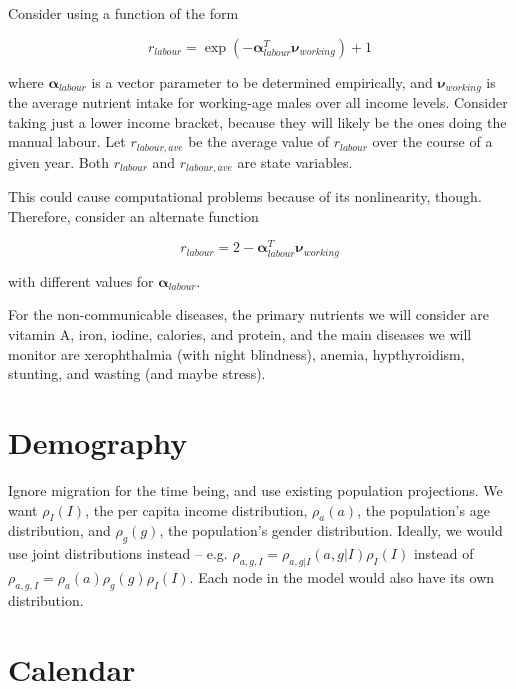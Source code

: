 \documentclass[letter,12pt]{article}
\begin{document}
Consider using a function of the form

\begin{equation}
r_{labour} = \exp \left(- \boldsymbol \alpha_{labour}^T \boldsymbol \nu_{working} \right) + 1
\end{equation}

\noindent where $\boldsymbol \alpha_{labour}$ is a vector parameter to be determined empirically, and $\boldsymbol \nu_{working}$ is the average nutrient intake for working-age males over all income levels.  Consider taking just a lower income bracket, because they will likely be the ones doing the manual labour.  Let $r_{labour,ave}$ be the average value of $r_{labour}$ over the course of a given year.  Both $r_{labour}$ and $r_{labour,ave}$ are state variables.

This could cause computational problems because of its nonlinearity, though.  Therefore, consider an alternate function

\begin{equation}
r_{labour} = 2 - \boldsymbol \alpha_{labour}^T \boldsymbol \nu_{working}
\end{equation}

\noindent with different values for $\boldsymbol \alpha_{labour}$.

For the non-communicable diseases, the primary nutrients we will consider are vitamin A, iron, iodine, calories, and protein, and the main diseases we will monitor are xerophthalmia (with night blindness), anemia, hypthyroidism, stunting, and wasting (and maybe stress).

\section{Demography}

Ignore migration for the time being, and use existing population projections.  We want $\rho_I \left(I\right)$, the per capita income distribution, $\rho_{a} \left(a\right)$, the population's age distribution, and $\rho_g \left(g\right)$, the population's gender distribution.  Ideally, we would use joint distributions instead -- e.g. $\rho_{a,g,I} = \rho_{a,g|I} \left(a,g|I\right) \rho_I \left(I\right)$ instead of $\rho_{a,g,I} = \rho_{a} \left(a\right) \rho_g \left(g\right) \rho_I \left(I\right)$.  Each node in the model would also have its own distribution.

\section{Calendar}
\end{document}

